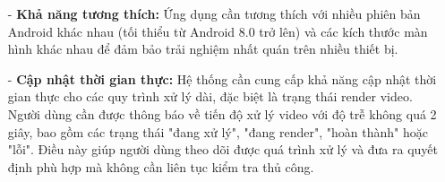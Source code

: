 \begin{itemize}
    \item[-] \textbf{Khả năng tương thích:} Ứng dụng cần tương thích với nhiều phiên bản Android khác nhau (tối thiểu từ Android 8.0 trở lên) và các kích thước màn hình khác nhau để đảm bảo trải nghiệm nhất quán trên nhiều thiết bị.
    
    \item[-] \textbf{Cập nhật thời gian thực:} Hệ thống cần cung cấp khả năng cập nhật thời gian thực cho các quy trình xử lý dài, đặc biệt là trạng thái render video. Người dùng cần được thông báo về tiến độ xử lý video với độ trễ không quá 2 giây, bao gồm các trạng thái "đang xử lý", "đang render", "hoàn thành" hoặc "lỗi". Điều này giúp người dùng theo dõi được quá trình xử lý và đưa ra quyết định phù hợp mà không cần liên tục kiểm tra thủ công.
    
\end{itemize}